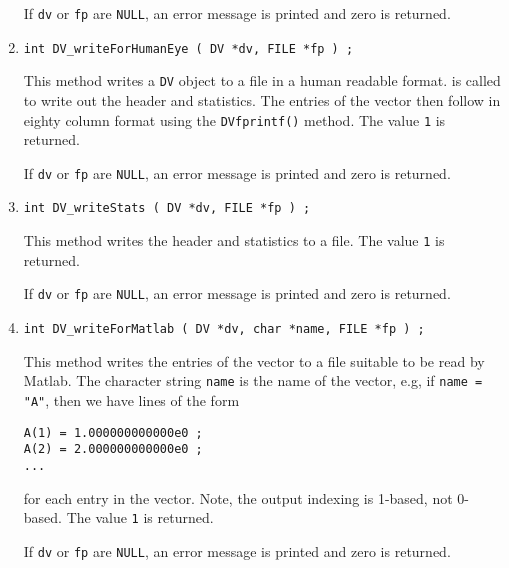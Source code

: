 \begin{enumerate}
\par {}
If {\tt dv} or {\tt fp} are {\tt NULL},
an error message is printed and zero is returned.
\item
\begin{verbatim}
int DV_writeForHumanEye ( DV *dv, FILE *fp ) ;
\end{verbatim}
\par
This method writes a {\tt DV} object to a file in a human
readable format.
is called to write out the
header and statistics. 
The entries of the vector then follow in eighty column format
using the {\tt DVfprintf()} method.
The value {\tt 1} is returned.
\par {}
If {\tt dv} or {\tt fp} are {\tt NULL},
an error message is printed and zero is returned.
\item
\begin{verbatim}
int DV_writeStats ( DV *dv, FILE *fp ) ;
\end{verbatim}
\par
This method writes the header and statistics to a file.
The value {\tt 1} is returned.
\par {}
If {\tt dv} or {\tt fp} are {\tt NULL},
an error message is printed and zero is returned.
\item
\begin{verbatim}
int DV_writeForMatlab ( DV *dv, char *name, FILE *fp ) ;
\end{verbatim}
\par
This method writes the entries of the vector to a file
suitable to be read by Matlab.
The character string {\tt name} is the name of the vector,
e.g, if {\tt name = "A"}, then we have lines of the form
\begin{verbatim}
A(1) = 1.000000000000e0 ;
A(2) = 2.000000000000e0 ;
...
\end{verbatim}
for each entry in the vector.
Note, the output indexing is 1-based, not 0-based.
The value {\tt 1} is returned.
\par {}
If {\tt dv} or {\tt fp} are {\tt NULL},
an error message is printed and zero is returned.
\end{enumerate}
